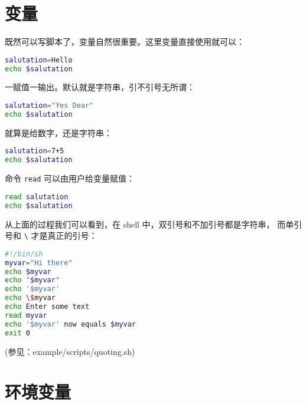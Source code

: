 \documentclass[a4paper]{ctexart}
\begin{document}
\section{变量}

既然可以写脚本了，变量自然很重要。这里变量直接使用就可以：
\begin{lstlisting}[language=sh]
salutation=Hello
echo $salutation
\end{lstlisting}
一赋值一输出。默认就是字符串，引不引号无所谓：
\begin{lstlisting}[language=sh]
salutation="Yes Dear"
echo $salutation
\end{lstlisting}
就算是给数字，还是字符串：
\begin{lstlisting}[language=sh]
salutation=7+5
echo $salutation
\end{lstlisting}

命令 \verb|read| 可以由用户给变量赋值：
\begin{lstlisting}[language=sh]
read salutation
echo $salutation
\end{lstlisting}

从上面的过程我们可以看到，在 shell 中，双引号和不加引号都是字符串，
而单引号和 \verb|\| 才是真正的引号：
\begin{lstlisting}[language=sh]
#!/bin/sh
myvar="Hi there"
echo $myvar
echo "$myvar"
echo '$myvar'
echo \$myvar
echo Enter some text
read myvar
echo '$myvar' now equals $myvar
exit 0
\end{lstlisting}
(参见：example/scripts/quoting.sh)

\section{环境变量}
\end{document}
